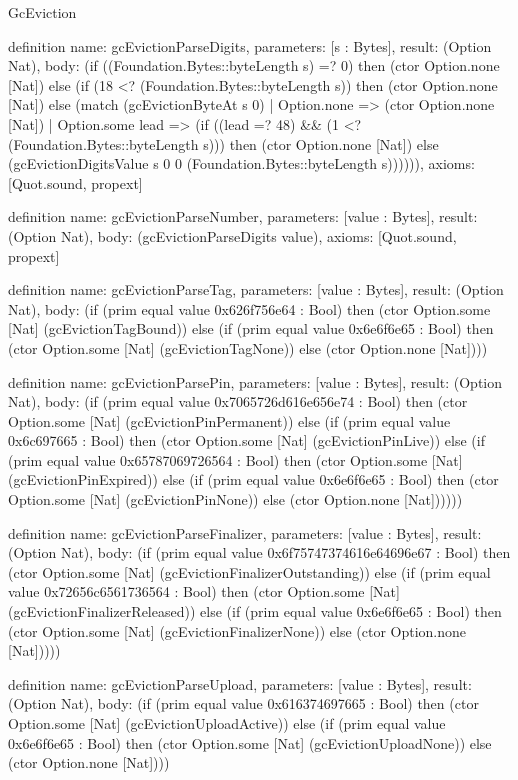 \begin{lexlean}{GcEviction}
\begin{semanticmodule}
definition{
  name: gcEvictionParseDigits,
  parameters: [s : Bytes],
  result: (Option Nat),
  body: (if ((Foundation.Bytes::byteLength s) =? 0) then (ctor Option.none [Nat]) else (if (18 <? (Foundation.Bytes::byteLength s)) then (ctor Option.none [Nat]) else (match (gcEvictionByteAt s 0)
    | Option.none => (ctor Option.none [Nat])
    | Option.some lead => (if ((lead =? 48) && (1 <? (Foundation.Bytes::byteLength s))) then (ctor Option.none [Nat]) else (gcEvictionDigitsValue s 0 0 (Foundation.Bytes::byteLength s)))))),
  axioms: [Quot.sound, propext]
}

definition{
  name: gcEvictionParseNumber,
  parameters: [value : Bytes],
  result: (Option Nat),
  body: (gcEvictionParseDigits value),
  axioms: [Quot.sound, propext]
}

definition{
  name: gcEvictionParseTag,
  parameters: [value : Bytes],
  result: (Option Nat),
  body: (if (prim equal value 0x626f756e64 : Bool) then (ctor Option.some [Nat] (gcEvictionTagBound)) else (if (prim equal value 0x6e6f6e65 : Bool) then (ctor Option.some [Nat] (gcEvictionTagNone)) else (ctor Option.none [Nat])))
}

definition{
  name: gcEvictionParsePin,
  parameters: [value : Bytes],
  result: (Option Nat),
  body: (if (prim equal value 0x7065726d616e656e74 : Bool) then (ctor Option.some [Nat] (gcEvictionPinPermanent)) else (if (prim equal value 0x6c697665 : Bool) then (ctor Option.some [Nat] (gcEvictionPinLive)) else (if (prim equal value 0x65787069726564 : Bool) then (ctor Option.some [Nat] (gcEvictionPinExpired)) else (if (prim equal value 0x6e6f6e65 : Bool) then (ctor Option.some [Nat] (gcEvictionPinNone)) else (ctor Option.none [Nat])))))
}

definition{
  name: gcEvictionParseFinalizer,
  parameters: [value : Bytes],
  result: (Option Nat),
  body: (if (prim equal value 0x6f75747374616e64696e67 : Bool) then (ctor Option.some [Nat] (gcEvictionFinalizerOutstanding)) else (if (prim equal value 0x72656c6561736564 : Bool) then (ctor Option.some [Nat] (gcEvictionFinalizerReleased)) else (if (prim equal value 0x6e6f6e65 : Bool) then (ctor Option.some [Nat] (gcEvictionFinalizerNone)) else (ctor Option.none [Nat]))))
}

definition{
  name: gcEvictionParseUpload,
  parameters: [value : Bytes],
  result: (Option Nat),
  body: (if (prim equal value 0x616374697665 : Bool) then (ctor Option.some [Nat] (gcEvictionUploadActive)) else (if (prim equal value 0x6e6f6e65 : Bool) then (ctor Option.some [Nat] (gcEvictionUploadNone)) else (ctor Option.none [Nat])))
}


\end{semanticmodule}
\end{lexlean}
